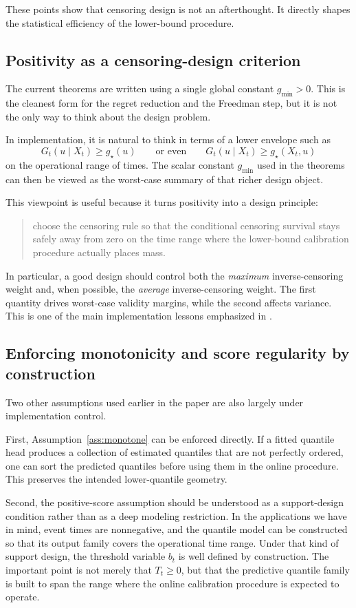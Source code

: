 \documentclass[11pt]{article}
\newcommand{\1}{\mathbf{1}}
\begin{document}
These points show that censoring design is not an afterthought. It directly shapes the statistical efficiency of the lower-bound procedure.

\subsection{Positivity as a censoring-design criterion}

The current theorems are written using a single global constant $g_{\min}>0$. This is the cleanest form for the regret reduction and the Freedman step, but it is not the only way to think about the design problem.

In implementation, it is natural to think in terms of a lower envelope such as
\[
G_t(u\mid X_t)\ge g_\star(u)
\qquad\text{or even}\qquad
G_t(u\mid X_t)\ge g_\star(X_t,u)
\]
on the operational range of times. The scalar constant $g_{\min}$ used in the theorems can then be viewed as the worst-case summary of that richer design object.

This viewpoint is useful because it turns positivity into a design principle:
\begin{quote}
choose the censoring rule so that the conditional censoring survival stays safely away from zero on the time range where the lower-bound calibration procedure actually places mass.
\end{quote}
In particular, a good design should control both the \emph{maximum} inverse-censoring weight and, when possible, the \emph{average} inverse-censoring weight. The first quantity drives worst-case validity margins, while the second affects variance. This is one of the main implementation lessons emphasized in \citet{Davidov2025}.

\subsection{Enforcing monotonicity and score regularity by construction}

Two other assumptions used earlier in the paper are also largely under implementation control.

First, Assumption~\ref{ass:monotone} can be enforced directly. If a fitted quantile head produces a collection of estimated quantiles that are not perfectly ordered, one can sort the predicted quantiles before using them in the online procedure. This preserves the intended lower-quantile geometry.

Second, the positive-score assumption should be understood as a support-design condition rather than as a deep modeling restriction. In the applications we have in mind, event times are nonnegative, and the quantile model can be constructed so that its output family covers the operational time range. Under that kind of support design, the threshold variable $b_t$ is well defined by construction. The important point is not merely that $T_t\ge 0$, but that the predictive quantile family is built to span the range where the online calibration procedure is expected to operate.
\end{document}

